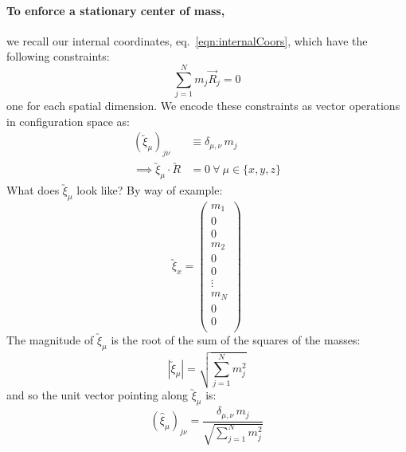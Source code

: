 \documentclass[letter,11pt]{article}
\newcommand{\cvec}[1]{\utilde{#1}}
\newcommand{\svec}[1]{\vec{#1}}
\newcommand{\refeq}[1]{eq.~\ref{eqn:#1}}
\begin{document}
\paragraph{To enforce a stationary center of mass,} we recall our internal coordinates, \refeq{internalCoors}, which have the following constraints:
\begin{equation}
  \sum_{j=1}^{N}m_j \svec{R}_j = 0
\end{equation}
one for each spatial dimension. We encode these constraints as vector operations in configuration space as:
\begin{align}
  {\left( \cvec{\xi}_{\mu}\right)}_{j\nu} &\equiv \delta_{\mu,\nu} \, m_j\\
  \implies \cvec{\xi}_{\mu} \cdot \cvec{R} &= 0\ \forall\ \mu \in \{x,y,z\}
\end{align}
What does $\cvec{\xi}_{\mu}$ look like? By way of example:
\[
  \cvec{\xi}_{x} =
  \begin{pmatrix}
    m_1    \\
    0      \\
    0      \\
    m_2    \\
    0      \\
    0      \\
    \vdots \\
    m_N    \\
    0      \\
    0      \\
  \end{pmatrix}
\]
The magnitude of $\cvec{\xi}_{\mu}$ is the root of the sum of the squares of the masses:
\begin{equation}
  \left| \cvec{\xi}_{\mu} \right| = \sqrt{\sum_{j=1}^N m_j^2}
\end{equation}
and so the unit vector pointing along $\cvec{\xi}_{\mu}$ is:
\begin{equation}
  {\left( \hat{\xi}_{\mu} \right)}_{j\nu} = \frac{\delta_{\mu,\nu} \, m_j}{\sqrt{\sum_{j=1}^N m_j^2}}
\end{equation}
\end{document}
